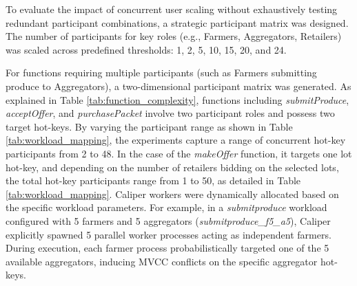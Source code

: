 ﻿\documentclass[12pt]{article}
\begin{document}
To evaluate the impact of concurrent user scaling without exhaustively testing redundant participant combinations, a strategic participant matrix was designed. The number of participants for key roles (e.g., Farmers, Aggregators, Retailers) was scaled across predefined thresholds: 1, 2, 5, 10, 15, 20, and 24. 

For functions requiring multiple participants (such as Farmers submitting produce to Aggregators), a two-dimensional participant matrix was generated. As explained in Table \ref{tab:function_complexity}, functions including \textit{submitProduce}, \textit{acceptOffer}, and \textit{purchasePacket} involve two participant roles and possess two target hot-keys. By varying the participant range as shown in Table \ref{tab:workload_mapping}, the experiments capture a range of concurrent hot-key participants from 2 to 48. In the case of the \textit{makeOffer} function, it targets one lot hot-key, and depending on the number of retailers bidding on the selected lots, the total hot-key participants range from 1 to 50, as detailed in Table \ref{tab:workload_mapping}.
Caliper workers were dynamically allocated based on the specific workload parameters. For example, in a \textit{submitproduce} workload configured with 5 farmers and 5 aggregators (\textit{submitproduce\_f5\_a5}), Caliper explicitly spawned 5 parallel worker processes acting as independent farmers. During execution, each farmer process probabilistically targeted one of the 5 available aggregators, inducing MVCC conflicts on the specific aggregator hot-keys.

\begin{table}[ht]
\centering
\caption{Benchmark Workload Configurations and Participant Mapping}
\label{tab:workload_mapping}
\end{table}
\end{document}
